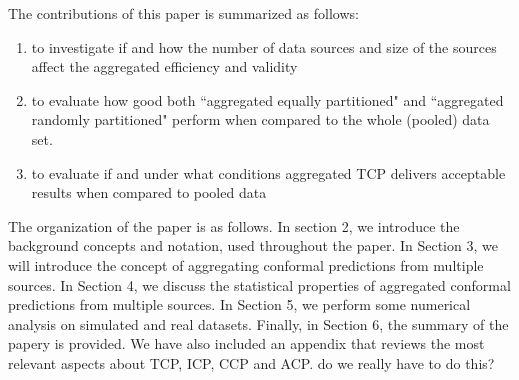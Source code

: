 \documentclass[main]{subfiles}
\newcommand{\todo}[1]{{\color{blue} #1 }}
\begin{document}

The contributions of this paper is summarized as follows:

\begin{enumerate}
\item to investigate if and how the number of data sources and size of the sources affect the aggregated efficiency and validity

\item to evaluate how good both ``aggregated equally partitioned" and ``aggregated randomly partitioned" perform when compared to the whole (pooled) data set.

\item to evaluate if and under what conditions aggregated TCP delivers acceptable results when compared to pooled data



\end{enumerate}

The organization of the paper is as follows. In section 2, we introduce the background concepts and notation, used throughout the paper. In Section 3, we will introduce the concept of aggregating conformal predictions from multiple sources. In Section 4, we discuss the statistical properties of aggregated conformal predictions from multiple sources. In Section 5, we perform some numerical analysis on simulated and real datasets. Finally, in Section 6, the summary of the papery is provided.
We have also included an appendix that reviews the most relevant aspects about TCP, ICP, CCP and ACP.\todo{do we really have to do this?}
\end{document}
